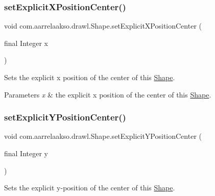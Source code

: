 \subsubsection{\texorpdfstring{set\+Explicit\+X\+Position\+Center()}{setExplicitXPositionCenter()}\hspace{0.1cm}{\footnotesize\ttfamily [2/2]}}
{\footnotesize\ttfamily void com.\+aarrelaakso.\+drawl.\+Shape.\+set\+Explicit\+X\+Position\+Center (\begin{DoxyParamCaption}\item[{final Integer}]{x }\end{DoxyParamCaption})\hspace{0.3cm}{\ttfamily [protected]}}



Sets the explicit x position of the center of this \hyperlink{classcom_1_1aarrelaakso_1_1drawl_1_1_shape}{Shape}. 


\begin{DoxyParams}{Parameters}
{\em x} & the explicit x position of the center of this \hyperlink{classcom_1_1aarrelaakso_1_1drawl_1_1_shape}{Shape}. \\
\hline
\end{DoxyParams}
\mbox{\label{classcom_1_1aarrelaakso_1_1drawl_1_1_shape_a93e9e1bdd05f111661660e9de621cd12}} 
\subsubsection{\texorpdfstring{set\+Explicit\+Y\+Position\+Center()}{setExplicitYPositionCenter()}\hspace{0.1cm}{\footnotesize\ttfamily [1/2]}}
{\footnotesize\ttfamily void com.\+aarrelaakso.\+drawl.\+Shape.\+set\+Explicit\+Y\+Position\+Center (\begin{DoxyParamCaption}\item[{final Integer}]{y }\end{DoxyParamCaption})\hspace{0.3cm}{\ttfamily [protected]}}



Sets the explicit y-\/position of the center of this \hyperlink{classcom_1_1aarrelaakso_1_1drawl_1_1_shape}{Shape}. 

